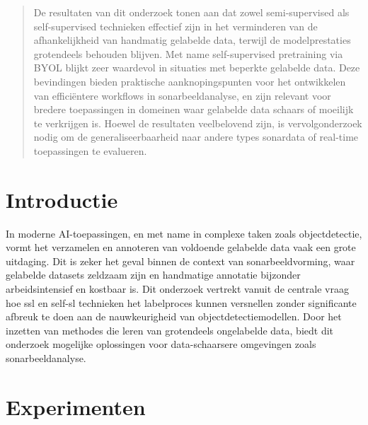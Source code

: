 \documentclass[a0,portrait]{hogent-poster}
\begin{document}
\begin{abstract}
De resultaten van dit onderzoek tonen aan dat zowel semi-supervised als self-supervised technieken effectief zijn in het verminderen van de afhankelijkheid van handmatig gelabelde data, terwijl de modelprestaties grotendeels behouden blijven. Met name self-supervised pretraining via BYOL blijkt zeer waardevol in situaties met beperkte gelabelde data. Deze bevindingen bieden praktische aanknopingspunten voor het ontwikkelen van efficiëntere workflows in sonarbeeldanalyse, en zijn relevant voor bredere toepassingen in domeinen waar gelabelde data schaars of moeilijk te verkrijgen is. Hoewel de resultaten veelbelovend zijn, is vervolgonderzoek nodig om de generaliseerbaarheid naar andere types sonardata of real-time toepassingen te evalueren.
\end{abstract}

\begin{multicols}{2} %

\section{Introductie}

In moderne AI-toepassingen, en met name in complexe taken zoals objectdetectie, vormt het verzamelen en annoteren van voldoende gelabelde data vaak een grote uitdaging. Dit is zeker het geval binnen de context van sonarbeeldvorming, waar gelabelde datasets zeldzaam zijn en handmatige annotatie bijzonder arbeidsintensief en kostbaar is. Dit onderzoek vertrekt vanuit de centrale vraag hoe \gls{ssl} en \gls{self-sl} technieken het labelproces kunnen versnellen zonder significante afbreuk te doen aan de nauwkeurigheid van objectdetectiemodellen. Door het inzetten van methodes die leren van grotendeels ongelabelde data, biedt dit onderzoek mogelijke oplossingen voor data-schaarsere omgevingen zoals sonarbeeldanalyse.

\section{Experimenten}


\end{multicols}
\end{document}
